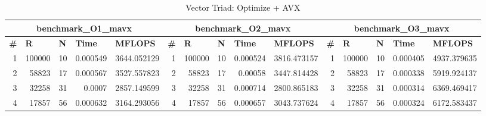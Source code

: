 \begin{table}[htbp]
	\centering
	\caption{Vector Triad: Optimize + AVX}
	\begin{tabular}{|r|r|r|r|r|r|r|r|r|r|r|r|r|r|r|}
		\toprule
		\multicolumn{5}{|c|}{\textbf{benchmark\_O1\_mavx   }} & \multicolumn{5}{c|}{\textbf{benchmark\_O2\_mavx   }} & \multicolumn{5}{c|}{\textbf{benchmark\_O3\_mavx   }} \\
		\midrule
		\multicolumn{1}{|l|}{\textbf{\#}} & \multicolumn{1}{l|}{\textbf{R}} & \multicolumn{1}{l|}{\textbf{N}} & \multicolumn{1}{l|}{\textbf{Time}} & \multicolumn{1}{l|}{\textbf{MFLOPS}} & \multicolumn{1}{l|}{\textbf{\#}} & \multicolumn{1}{l|}{\textbf{R}} & \multicolumn{1}{l|}{\textbf{N}} & \multicolumn{1}{l|}{\textbf{Time}} & \multicolumn{1}{l|}{\textbf{MFLOPS}} & \multicolumn{1}{l|}{\textbf{\#}} & \multicolumn{1}{l|}{\textbf{R}} & \multicolumn{1}{l|}{\textbf{N}} & \multicolumn{1}{l|}{\textbf{Time}} & \multicolumn{1}{l|}{\textbf{MFLOPS}} \\
		\midrule
		1                                 & 100000                          & 10                              & 0.000549                           & 3644.052129                          & 1                                & 100000                          & 10                              & 0.000524                           & 3816.473157                          & 1  & 100000 & 10      & 0.000405 & 4937.379635 \\
		\midrule
		2                                 & 58823                           & 17                              & 0.000567                           & 3527.557823                          & 2                                & 58823                           & 17                              & 0.00058                            & 3447.814428                          & 2  & 58823 & 17      & 0.000338 & 5919.924137 \\
		\midrule
		3                                 & 32258                           & 31                              & 0.0007                             & 2857.149599                          & 3                                & 32258                           & 31                              & 0.000714                           & 2800.865183                          & 3  & 32258 & 31      & 0.000314 & 6369.469417 \\
		\midrule
		4                                 & 17857                           & 56                              & 0.000632                           & 3164.293056                          & 4                                & 17857                           & 56                              & 0.000657                           & 3043.737624                          & 4  & 17857 & 56      & 0.000324 & 6172.583437 \\

\end{tabular}
\end{table}
